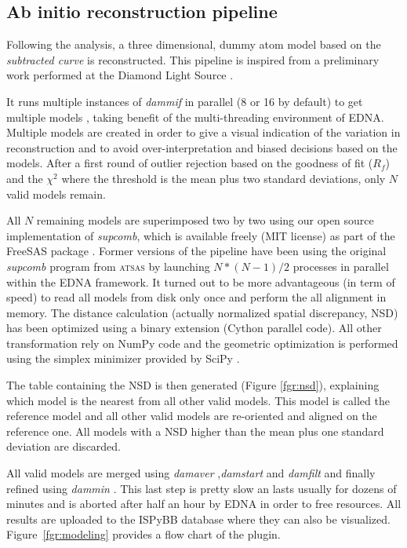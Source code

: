 \documentclass[preprint,pdf]{iucr}              %
\begin{document}
\subsection{Ab initio reconstruction pipeline}
\label{abinitio}
Following the analysis, a three dimensional, dummy atom model based
on the \textit{subtracted curve} is reconstructed.
This pipeline is inspired from a preliminary work
performed at the Diamond Light Source \cite{DiamondSE}.

It runs multiple instances of \textit{dammif} in parallel (8 or 16 by default)
to get multiple models \cite{dammif}, taking benefit of the multi-threading
environment of EDNA.
Multiple models are created in order to give a visual indication of the variation in 
reconstruction and to avoid over-interpretation and biased decisions based on
the models.
After a first round of outlier rejection based on the goodness of fit ($R_{f}$)
and the $\chi^{2}$ where the threshold is the mean plus two standard
deviations, only $N$ valid models remain.

All $N$ remaining models are superimposed two by two using
our open source implementation of \textit{supcomb}, which is available freely
(MIT license) as part of the FreeSAS package \cite{freesas}.  
Former versions of the pipeline have been using the original 
\textit{supcomb} \cite{supcomb} program from \textsc{atsas} by launching
$N*(N-1)/2$ processes in parallel within the EDNA framework. 
It turned out to be more advantageous (in term of speed) to read all models 
from disk only once and perform the all alignment in memory. 
The distance calculation (actually normalized spatial discrepancy, NSD) has
been optimized using a binary extension (Cython parallel code). 
All other transformation rely on NumPy \cite{numpy} code and the geometric
optimization is performed using the simplex minimizer provided by SciPy \cite{scipy}.

The table containing the NSD is then generated
(Figure \ref{fgr:nsd}), explaining which model is the nearest from all other
valid models. This model is called the reference model and all other valid
models are re-oriented and aligned on the reference one. 
All models with a NSD higher than the mean plus one standard deviation are
discarded.

All valid models are merged using \textit{damaver} \cite{damaver},\textit{damstart} and
\textit{damfilt} and finally refined using \textit{dammin} \cite{dammin}.
This last step is pretty slow an lasts usually for dozens of minutes and is
aborted after half an hour by EDNA in order to free resources. 
All results are uploaded to the ISPyBB database where they can also be
visualized. Figure~\ref{fgr:modeling} provides a flow chart of the plugin.
\end{document}
